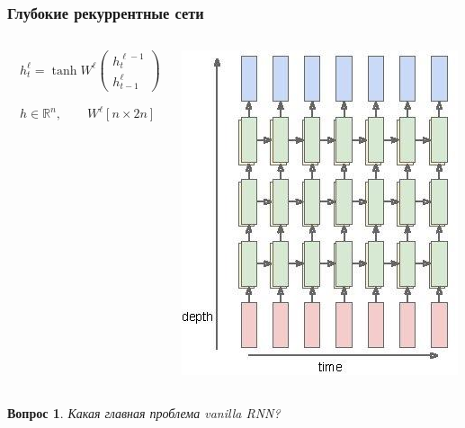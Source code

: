 \documentclass[fullscreen=true, bookmarks=true, hyperref={pdfencoding=unicode}]{beamer}
\newtheorem*{question}{Вопрос}
\begin{document}
\begin{frame}
  \frametitle{Глубокие рекуррентные сети}
  \begin{columns}
      \begin{column}{.4\paperwidth}
        $\quad h_t^\ell = \tanh W^\ell \left(\begin{array}{c}
         h_t^{\ell-1} \\ h_{t-1}^{\ell}
        \end{array}\right)$

        $\quad h \in \mathbb{R}^n, \quad\quad W^\ell [n \times 2n]$
      \end{column}
      \begin{column}{.4\paperwidth}
        \includegraphics[keepaspectratio,
                         width=0.4\paperwidth]{rnn_depth.jpg}
      \end{column}
  \end{columns}
  \pause
  \begin{question}
  Какая главная проблема vanilla RNN?
  \end{question}
\end{frame}
\end{document}
